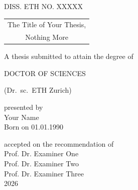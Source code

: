 
\begin{titlingpage}
  \hfill
  \begin{minipage}{\linewidth}
    \begin{center}

      DISS. ETH NO. XXXXX

      \vspace*{2cm}

      {\LARGE
        \begin{tabular}{@{}c@{}}
          The Title of Your Thesis, \\
          Nothing More
      \end{tabular}}

      \vspace*{3cm}
      A thesis submitted to attain the degree of

      \uppercase{Doctor of Sciences}

      (Dr.\ sc.\ ETH Zurich)

      \vspace*{1cm}

      presented by \\
      Your Name  \\
      Born on 01.01.1990 \\

      \vspace*{3cm}

      accepted on the recommendation of \\
      Prof. Dr. Examiner One \\
      Prof. Dr. Examiner Two  \\
      Prof. Dr. Examiner Three \\

      \vspace*{3cm}
      2026

    \end{center}
  \end{minipage}
\end{titlingpage}
